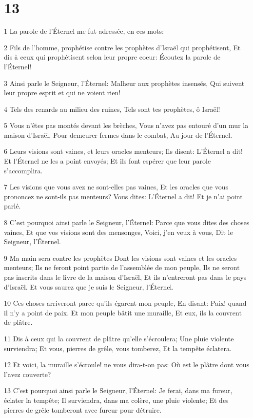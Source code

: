 \chapter{13}

\par 1 La parole de l'Éternel me fut adressée, en ces mots:
\par 2 Fils de l'homme, prophétise contre les prophètes d'Israël qui prophétisent, Et dis à ceux qui prophétisent selon leur propre coeur: Écoutez la parole de l'Éternel!
\par 3 Ainsi parle le Seigneur, l'Éternel: Malheur aux prophètes insensés, Qui suivent leur propre esprit et qui ne voient rien!
\par 4 Tels des renards au milieu des ruines, Tels sont tes prophètes, ô Israël!
\par 5 Vous n'êtes pas montés devant les brèches, Vous n'avez pas entouré d'un mur la maison d'Israël, Pour demeurer fermes dans le combat, Au jour de l'Éternel.
\par 6 Leurs visions sont vaines, et leurs oracles menteurs; Ils disent: L'Éternel a dit! Et l'Éternel ne les a point envoyés; Et ils font espérer que leur parole s'accomplira.
\par 7 Les visions que vous avez ne sont-elles pas vaines, Et les oracles que vous prononcez ne sont-ils pas menteurs? Vous dites: L'Éternel a dit! Et je n'ai point parlé.
\par 8 C'est pourquoi ainsi parle le Seigneur, l'Éternel: Parce que vous dites des choses vaines, Et que vos visions sont des mensonges, Voici, j'en veux à vous, Dit le Seigneur, l'Éternel.
\par 9 Ma main sera contre les prophètes Dont les visions sont vaines et les oracles menteurs; Ils ne feront point partie de l'assemblée de mon peuple, Ils ne seront pas inscrits dans le livre de la maison d'Israël, Et ils n'entreront pas dans le pays d'Israël. Et vous saurez que je suis le Seigneur, l'Éternel.
\par 10 Ces choses arriveront parce qu'ils égarent mon peuple, En disant: Paix! quand il n'y a point de paix. Et mon peuple bâtit une muraille, Et eux, ils la couvrent de plâtre.
\par 11 Dis à ceux qui la couvrent de plâtre qu'elle s'écroulera; Une pluie violente surviendra; Et vous, pierres de grêle, vous tomberez, Et la tempête éclatera.
\par 12 Et voici, la muraille s'écroule! ne vous dira-t-on pas: Où est le plâtre dont vous l'avez couverte?
\par 13 C'est pourquoi ainsi parle le Seigneur, l'Éternel: Je ferai, dans ma fureur, éclater la tempête; Il surviendra, dans ma colère, une pluie violente; Et des pierres de grêle tomberont avec fureur pour détruire.
